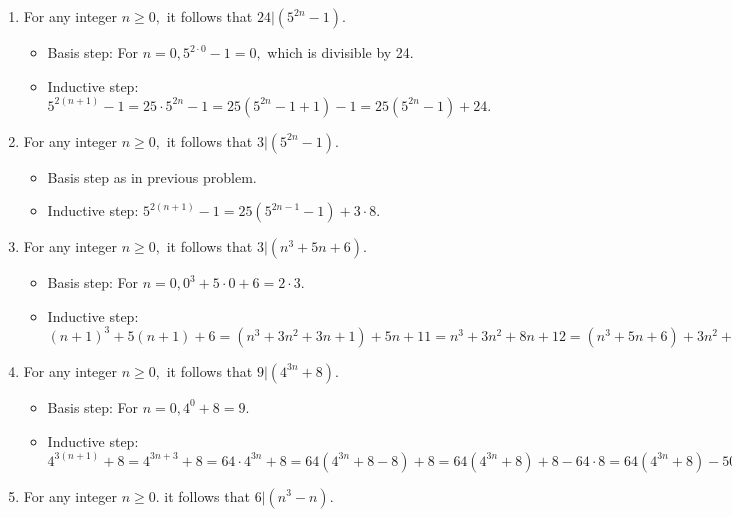 \documentclass[11pt, oneside]{amsart}
\begin{document}
\begin{enumerate}
\label{sec:orgbb775d7}
\begin{itemize}
\item Basis step: \(\frac{1}{2!} = 1 - \frac{1}{2}.\)
\item Inductive step: \(\sum_{k=1}^{n+1} \frac{k}{(k+1)!} = \frac{n+1}{(n+2)!} + \sum_{k=1}^n
      \frac{k}{(k+1)!} = \frac{n+1}{(n+2)!} + 1 - \frac{1}{(n+1)!} = 1 + \frac{n+1}{(n+2)!} - \frac{n+2}{(n+2)!} = 1 -
      \frac{1}{(n+2)!}.\)
\end{itemize}
\item For any integer \(n \geq 0,\) it follows that \(24 \vert (5^{2n}-1).\)
\label{sec:orgaa5ff7f}
\begin{itemize}
\item Basis step: For \(n=0, 5^{2\cdot 0}-1 = 0,\) which is divisible by 24.
\item Inductive step: \(5^{2(n+1)}-1 = 25\cdot 5^{2n} - 1 = 25 (5^{2n}-1+1) - 1 = 25 (5^{2n}-1) + 24.\)
\end{itemize}
\item For any integer \(n \geq 0,\) it follows that \(3 \vert (5^{2n}-1).\)
\label{sec:org3c39ed5}
\begin{itemize}
\item Basis step as in previous problem.
\item Inductive step: \(5^{2(n+1)}-1 = 25 (5^{2n-1}-1) + 3\cdot 8.\)
\end{itemize}
\item For any integer \(n \geq 0,\) it follows that \(3 \vert (n^3+5n+6).\)
\label{sec:org8c2bfe6}
\begin{itemize}
\item Basis step: For \(n=0, 0^3+5\cdot 0 + 6 = 2\cdot 3.\)
\item Inductive step: \((n+1)^3+5(n+1)+6 = (n^3+3n^2+3n+1) + 5n + 11 = n^3 + 3n^2 + 8n + 12 = (n^3+5n+6) + 3n^2 + 3n +
      6 = (n^3+5n+6) + 3(n^2+n+2).\)
\end{itemize}
\item For any integer \(n \geq 0,\) it follows that \(9 \vert (4^{3n}+8).\)
\label{sec:org448584f}
\begin{itemize}
\item Basis step: For \(n=0, 4^0+8 = 9.\)
\item Inductive step: \(4^{3(n+1)} + 8 = 4^{3n+3} + 8 = 64\cdot 4^{3n} + 8 = 64 (4^{3n} + 8 - 8) + 8 = 64 (4^{3n}+8) +
      8 - 64\cdot 8 = 64(4^{3n}+8) - 504 = 64(4^{3n}+8) - 9\cdot 56.\)
\end{itemize}
\item For any integer \(n \geq 0.\) it follows that \(6 \vert (n^3-n).\)

\end{enumerate}
\end{document}
